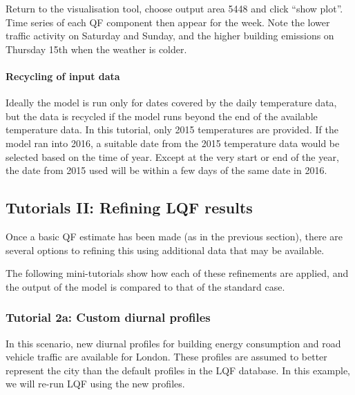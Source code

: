 \documentclass[letterpaper,10pt,english]{sphinxmanual}
\begin{document}
Return to the visualisation tool, choose output area 5448 and click
“show plot”. Time series of each QF component then appear for the week.
Note the lower traffic activity on Saturday and Sunday, and the higher
building emissions on Thursday 15th when the weather is colder.
\begin{quote}

\begin{figure}[htbp]
\centering
\capstart

\noindent{}
\caption{}\label{\detokenize{Tutorials/LQF:id9}}\end{figure}
\end{quote}


\paragraph{Recycling of input data}
\label{\detokenize{Tutorials/LQF:recycling-of-input-data}}
Ideally the model is run only for dates covered by the daily temperature
data, but the data is recycled if the model runs beyond the end of the
available temperature data. In this tutorial, only 2015 temperatures are
provided. If the model ran into 2016, a suitable date from the 2015
temperature data would be selected based on the time of year. Except at
the very start or end of the year, the date from 2015 used will be
within a few days of the same date in 2016.


\subsection{Tutorials II: Refining LQF results}
\label{\detokenize{Tutorials/LQF:tutorials-ii-refining-lqf-results}}
Once a basic QF estimate has been made (as in the previous section),
there are several options to refining this using additional data that
may be available.

The following mini-tutorials show how each of these refinements are
applied, and the output of the model is compared to that of the standard
case.


\subsubsection{Tutorial 2a: Custom diurnal profiles}
\label{\detokenize{Tutorials/LQF:tutorial-2a-custom-diurnal-profiles}}
In this scenario, new diurnal profiles for building energy consumption
and road vehicle traffic are available for London. These profiles are
assumed to better represent the city than the default profiles in the
LQF database. In this example, we will re-run LQF using the new
profiles.
\end{document}
